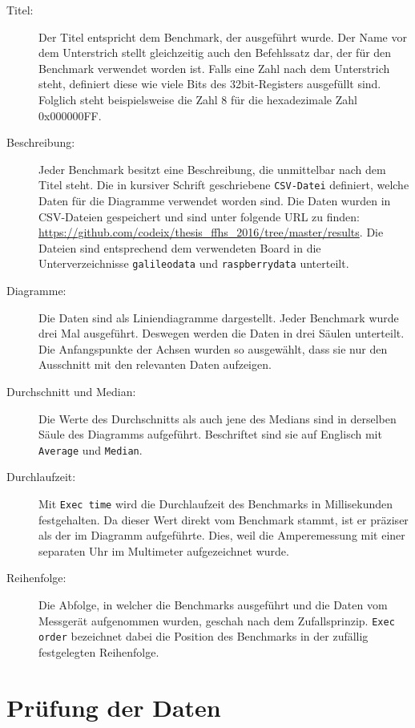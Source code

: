 \begin{description}
\item[Titel:]
Der Titel entspricht dem Benchmark, der ausgeführt wurde. Der Name vor dem Unterstrich stellt gleichzeitig auch den Befehlssatz dar, der für den Benchmark verwendet worden ist. Falls eine Zahl nach dem Unterstrich steht, definiert diese wie viele Bits des 32bit-Registers ausgefüllt sind. Folglich steht beispielsweise die Zahl 8 für die hexadezimale Zahl 0x000000FF.
\item[Beschreibung:]
Jeder Benchmark besitzt eine Beschreibung, die unmittelbar nach dem Titel steht. Die in kursiver Schrift geschriebene \texttt{CSV-Datei} definiert, welche Daten für die Diagramme verwendet worden sind. Die Daten wurden in CSV-Dateien gespeichert und sind unter folgende URL zu finden: \url{https://github.com/codeix/thesis_ffhs_2016/tree/master/results}. Die Dateien sind entsprechend dem verwendeten Board in die Unterverzeichnisse \texttt{galileodata} und \texttt{raspberrydata} unterteilt. 
\item[Diagramme:]
Die Daten sind als Liniendiagramme dargestellt. Jeder Benchmark wurde drei Mal ausgeführt. Deswegen werden die Daten in drei Säulen unterteilt. Die Anfangspunkte der Achsen wurden so ausgewählt, dass sie nur den Ausschnitt mit den relevanten Daten aufzeigen.
\item[Durchschnitt und Median:]
Die Werte des Durchschnitts als auch jene des Medians sind in derselben Säule des Diagramms aufgeführt. Beschriftet sind sie auf Englisch mit \texttt{Average} und \texttt{Median}.
\item[Durchlaufzeit:]
Mit \texttt{Exec time} wird die Durchlaufzeit des Benchmarks in Millisekunden festgehalten. Da dieser Wert direkt vom Benchmark stammt, ist er präziser als der im Diagramm aufgeführte. Dies, weil die Amperemessung mit einer separaten Uhr im Multimeter aufgezeichnet wurde.
\item[Reihenfolge:] Die Abfolge, in welcher die Benchmarks ausgeführt und die Daten vom Messgerät aufgenommen wurden, geschah nach dem Zufallsprinzip. \texttt{Exec order} bezeichnet dabei die Position des Benchmarks in der zufällig festgelegten Reihenfolge.

\end{description}



\section{Prüfung der Daten}

